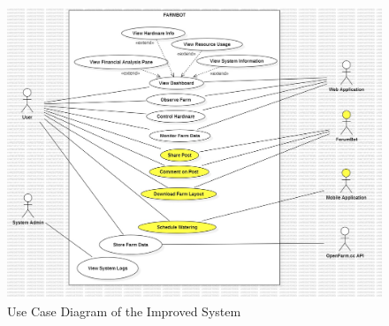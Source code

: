 \begin{figure}[htbp]
    \centering
    \includegraphics[width=1\linewidth]{Figures/use_case_diagram_improved.jpg}
    \caption{Use Case Diagram of the Improved System}
    \label{UseCaseImproved}
\end{figure}

\newpage


